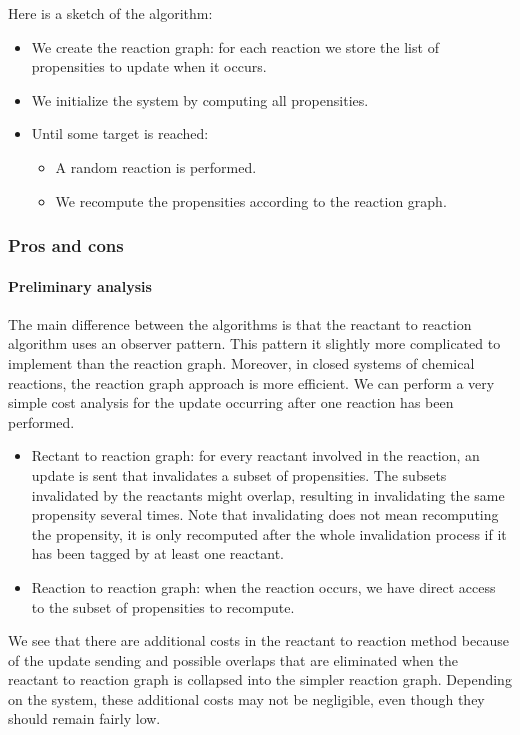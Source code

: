 Here is a sketch of the algorithm:
\begin{itemize}
  \item We create the reaction graph: for each reaction we store the list of propensities to update when it occurs.
  \item We initialize the system by computing all propensities.
  \item Until some target is reached:
    \begin{itemize}
      \item A random reaction is performed.
      \item We recompute the propensities according to the reaction graph.
    \end{itemize}
\end{itemize}

\subsubsection{Pros and cons}

\paragraph{Preliminary analysis} The main difference between the algorithms is that the reactant to reaction algorithm uses an observer pattern. This pattern it slightly more complicated to implement than the reaction graph. Moreover, in closed systems of chemical reactions, the reaction graph approach is more efficient. We can perform a very simple cost analysis for the update occurring after one reaction has been performed.

\begin{itemize}
  \item Rectant to reaction graph: for every reactant involved in the reaction, an update is sent that invalidates a subset of propensities. The subsets invalidated by the reactants might overlap, resulting in invalidating the same propensity several times. Note that invalidating does not mean recomputing the propensity, it is only recomputed after the whole invalidation process if it has been tagged by at least one reactant.
  \item Reaction to reaction graph: when the reaction occurs, we have direct access to the subset of propensities to recompute.
\end{itemize}

We see that there are additional costs in the reactant to reaction method because of the update sending and possible overlaps that are eliminated when the reactant to reaction graph is collapsed into the simpler reaction graph. Depending on the system, these additional costs may not be negligible, even though they should remain fairly low.

